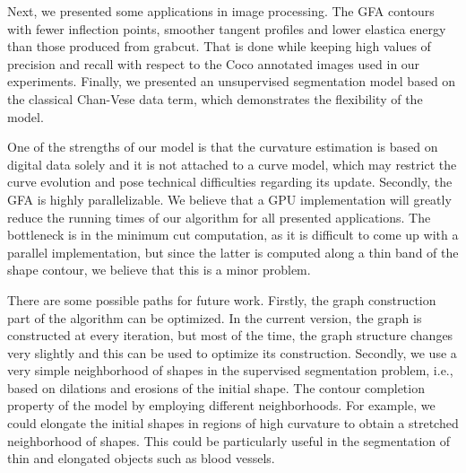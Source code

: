 \documentclass[review]{siamart220329}
\begin{document}
Next, we presented some applications in image processing. The GFA  contours with fewer inflection points, smoother tangent profiles and lower elastica energy than those produced from grabcut. That is done while keeping high values of precision and recall with respect to the Coco annotated images used in our experiments. Finally, we presented an unsupervised segmentation model based on the classical Chan-Vese data term, which demonstrates the flexibility of the model. 

One of the strengths of our model is that the curvature estimation is based on digital data solely and it is not attached to a curve model, which may restrict the curve evolution and pose technical difficulties regarding its update. Secondly, the GFA is highly parallelizable. We believe that a GPU implementation will greatly reduce the running times of our algorithm for all presented applications. The bottleneck is in the minimum cut computation, as it is difficult to come up with a parallel implementation, but since the latter is computed along a thin band of the shape contour, we believe that this is a minor problem.

There are some possible paths for future work. Firstly, the graph construction part of the algorithm can be optimized. In the current version, the graph is constructed at every iteration, but most of the time, the graph structure changes very slightly and this can be used to optimize its construction. Secondly, we use a very simple neighborhood of shapes in the supervised segmentation problem, i.e., based on dilations and erosions of the initial shape. The contour completion property of the model  by employing different neighborhoods. For example, we could elongate the initial shapes in regions of high curvature to obtain a stretched neighborhood of shapes. This could be particularly useful in the segmentation of thin and elongated objects such as blood vessels.
%
%
%
%


\end{document}
